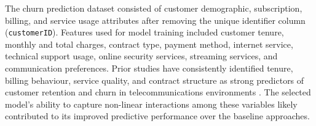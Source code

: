 The churn prediction dataset consisted of customer demographic,
subscription, billing, and service usage attributes after removing the
unique identifier column (\texttt{customerID}). Features used for model
training included customer tenure, monthly and total charges, contract
type, payment method, internet service, technical support usage, online
security services, streaming services, and communication preferences.
Prior studies have consistently identified tenure, billing behaviour,
service quality, and contract structure as strong predictors of customer
retention and churn in telecommunications environments
\citep{huang2012,reichheld2001}. The selected model's ability to capture
non-linear interactions among these variables likely contributed to its
improved predictive performance over the baseline approaches.
